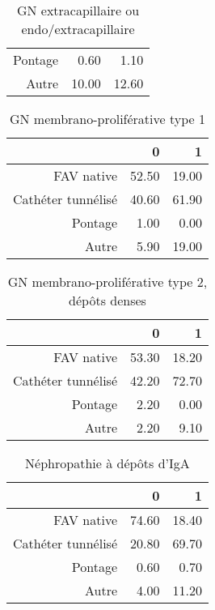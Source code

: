 \documentclass[11pt,a4paper]{article}\usepackage[]{graphicx}\usepackage[]{color}
\begin{document}
\begin{multicols}{2}
\begin{table}[H]
\begin{tabular}{rrr}
  Pontage & 0.60 & 1.10 \\ 
  Autre & 10.00 & 12.60 \\ 
   \hline
\end{tabular}
\caption{GN extracapillaire ou endo/extracapillaire} 
\end{table}
\begin{table}[H]
\centering
\begin{tabular}{rrr}
  \hline
 & 0 & 1 \\ 
  \hline
FAV native & 52.50 & 19.00 \\ 
  Cathéter tunnélisé & 40.60 & 61.90 \\ 
  Pontage & 1.00 & 0.00 \\ 
  Autre & 5.90 & 19.00 \\ 
   \hline
\end{tabular}
\caption{GN membrano-proliférative type 1} 
\end{table}
\begin{table}[H]
\centering
\begin{tabular}{rrr}
  \hline
 & 0 & 1 \\ 
  \hline
FAV native & 53.30 & 18.20 \\ 
  Cathéter tunnélisé & 42.20 & 72.70 \\ 
  Pontage & 2.20 & 0.00 \\ 
  Autre & 2.20 & 9.10 \\ 
   \hline
\end{tabular}
\caption{GN membrano-proliférative type 2, dépôts denses} 
\end{table}
\begin{table}[H]
\centering
\begin{tabular}{rrr}
  \hline
 & 0 & 1 \\ 
  \hline
FAV native & 74.60 & 18.40 \\ 
  Cathéter tunnélisé & 20.80 & 69.70 \\ 
  Pontage & 0.60 & 0.70 \\ 
  Autre & 4.00 & 11.20 \\ 
   \hline
\end{tabular}
\caption{Néphropathie à dépôts d'IgA} 
\end{table}

\end{multicols}
\end{document}
